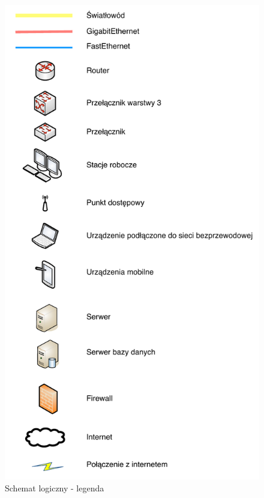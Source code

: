 \newpage
\begin{figure}[H]
  \begin{center}
    \includegraphics[scale = 0.7]{img/schemat-legenda.pdf}
    \caption{Schemat logiczny - legenda}
  \end{center}
\end{figure}

